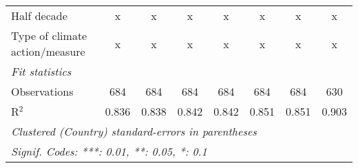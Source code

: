 \begin{table}[htbp]
\begin{tabular}{lccccccc}
      Half decade                                                             & x              & x              & x              & x              & x              & x              & x\\  
      Type of climate action/measure                                          & x              & x              & x              & x              & x              & x              & x\\  
      \midrule \emph{Fit statistics}\\
      Observations                                                            & 684            & 684            & 684            & 684            & 684            & 684            & 630\\  
      R$^2$                                                                   & 0.836          & 0.838          & 0.842          & 0.842          & 0.851          & 0.851          & 0.903\\  
      \midrule
      \multicolumn{8}{l}{\emph{Clustered (Country) standard-errors in parentheses}}\\
      \multicolumn{8}{l}{\emph{Signif. Codes: ***: 0.01, **: 0.05, *: 0.1}}\\
   \end{tabular}
\end{table}


